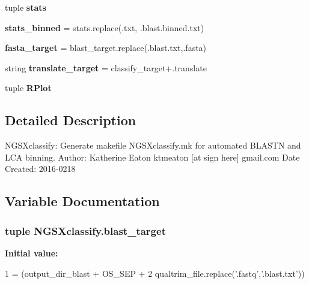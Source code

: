 \begin{DoxyCompactItemize}
\item 
tuple {\bfseries stats}
\item 
{\bfseries stats\+\_\+binned} = stats.\+replace(\textquotesingle{}.txt\textquotesingle{}, \textquotesingle{}.blast.\+binned.\+txt\textquotesingle{})\hypertarget{namespaceNGSXclassify_a374493fe09f4bce6b694f5108ce051ac}{}\label{namespaceNGSXclassify_a374493fe09f4bce6b694f5108ce051ac}

\item 
{\bfseries fasta\+\_\+target} = blast\+\_\+target.\+replace(\textquotesingle{}.blast.\+txt\textquotesingle{},\textquotesingle{}.fasta\textquotesingle{})\hypertarget{namespaceNGSXclassify_a0ddd87153fdf54de7e7e5356ae964e97}{}\label{namespaceNGSXclassify_a0ddd87153fdf54de7e7e5356ae964e97}

\item 
string {\bfseries translate\+\_\+target} = classify\+\_\+target+\textquotesingle{}.translate\textquotesingle{}\hypertarget{namespaceNGSXclassify_a6e942881a3f526c95523edd812b3025c}{}\label{namespaceNGSXclassify_a6e942881a3f526c95523edd812b3025c}

\item 
tuple {\bfseries R\+Plot}
\end{DoxyCompactItemize}


\subsection{Detailed Description}
\begin{DoxyVerb}NGSXclassify:  Generate makefile NGSXclassify.mk for automated BLASTN and LCA binning.
Author:         Katherine Eaton     ktmeaton [at sign here] gmail.com
Date Created:   2016-0218
\end{DoxyVerb}
 

\subsection{Variable Documentation}
\subsubsection[{\texorpdfstring{blast\+\_\+target}{blast_target}}]{\setlength{\rightskip}{0pt plus 5cm}tuple N\+G\+S\+Xclassify.\+blast\+\_\+target}\hypertarget{namespaceNGSXclassify_ab9e0e80b9fbd8f3f002eaea0c2d08f1c}{}\label{namespaceNGSXclassify_ab9e0e80b9fbd8f3f002eaea0c2d08f1c}
{\bfseries Initial value\+:}
\begin{DoxyCode}
1 = (output\_dir\_blast + OS\_SEP +
2                                 qualtrim\_file.replace(\textcolor{stringliteral}{'.fastq'},\textcolor{stringliteral}{'.blast.txt'}))
\end{DoxyCode}
